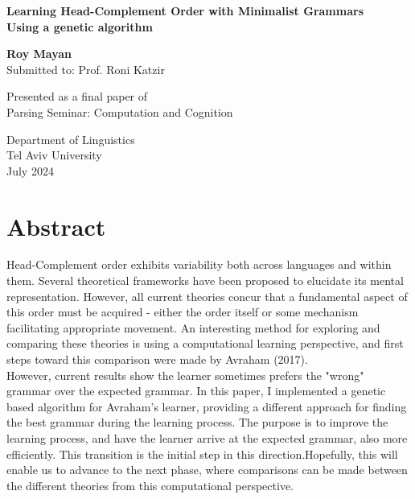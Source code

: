 \documentclass{article}
\begin{document}
\begin{titlepage}
    \begin{center}
	\vspace*{2cm}
        	\huge
        	\textbf{Learning Head-Complement Order with Minimalist Grammars \newline \\ Using a genetic algorithm}


            
        	\vspace{2cm}
        	\LARGE
        	\textbf{Roy Mayan}\\
       	Submitted to: Prof. Roni Katzir 
            
        	\vfill
          
	Presented as a final paper of\\
	Parsing Seminar: Computation and Cognition
            
        	\vspace{0.8cm}
            
        	\Large
       	Department of Linguistics\\
       	Tel Aviv University\\
        	July 2024
    \end{center}
\end{titlepage}


\section*{Abstract}
{\sffamily\small
Head-Complement order exhibits variability both across languages and within them. Several theoretical frameworks have been proposed to elucidate its mental representation. However, all current theories concur that a fundamental aspect of this order must be acquired - either the order itself or some mechanism facilitating appropriate movement. An interesting method for exploring and comparing these theories is using a computational learning perspective, and first steps toward this comparison were made by Avraham (2017). \\
However, current results show the learner sometimes prefers the "wrong" grammar over the expected grammar. In this paper, I implemented a genetic based algorithm for Avraham's learner, providing a different approach for finding the best grammar during the learning process. The purpose is to improve the learning process, and have the learner arrive at the expected grammar, also more efficiently. This transition is the initial step in this direction.Hopefully, this will enable us to advance to the next phase, where comparisons can be made between the different theories from this computational perspective.
}
\end{document}
